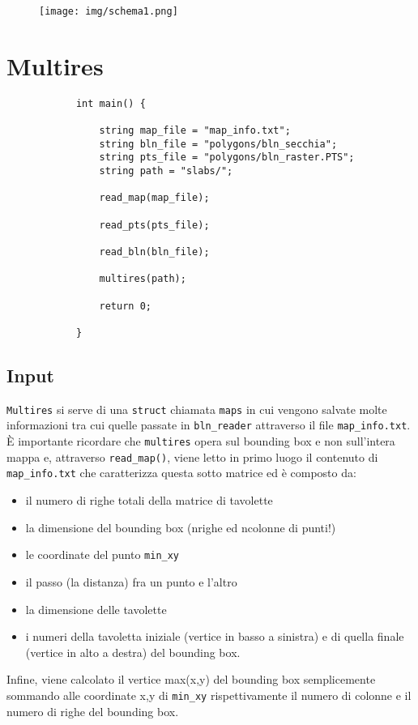 			\begin{figure}[htbp]
				\centering
				\texttt{[image: img/schema1.png]}
			\end{figure}
	\newpage
	\section{Multires}
		\begin{verbatim}
			int main() {
	
			    string map_file = "map_info.txt";
			    string bln_file = "polygons/bln_secchia";
			    string pts_file = "polygons/bln_raster.PTS";
			    string path = "slabs/";

			    read_map(map_file);

			    read_pts(pts_file);

			    read_bln(bln_file);

			    multires(path);

			    return 0;

			}
		\end{verbatim} 
		\subsection{Input}
			\texttt{Multires} si serve di una \texttt{struct} chiamata \texttt{maps} in cui vengono salvate molte informazioni tra cui quelle passate in \texttt{bln\_reader} attraverso il file \texttt{map\_info.txt}.
			\`{E} importante ricordare che \texttt{multires} opera sul bounding box e non sull'intera mappa e, attraverso \texttt{read\_map()}, viene letto in primo luogo il contenuto di \texttt{map\_info.txt} che caratterizza questa sotto matrice ed \`{e} composto da: 
			\begin{itemize}
				\item il numero di righe totali della matrice di tavolette
				\item la dimensione del bounding box (nrighe ed ncolonne di punti!)
				\item le coordinate del punto \texttt{min\_xy}
				\item il passo (la distanza) fra un punto e l'altro
				\item la dimensione delle tavolette
				\item i numeri della tavoletta iniziale (vertice in basso a sinistra) e di quella finale (vertice in alto a destra) del bounding box.
			\end{itemize}
			Infine, viene calcolato il vertice max(x,y) del bounding box semplicemente sommando alle coordinate x,y di \texttt{min\_xy} rispettivamente il numero di colonne e il numero di righe del bounding box.

